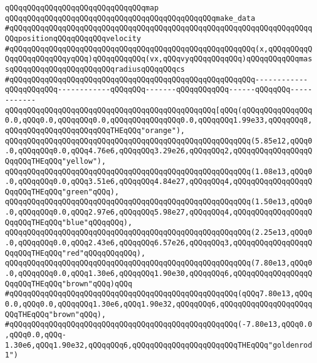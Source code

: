\verb|qQQqqQQqqQQqqQQqqQQqqQQqqQQqqQQqmap|\newline
\verb|qQQqqQQqqQQqqQQqqQQqqQQqqQQqqQQqqQQqqQQqqQQqqQQqmake_data|\newline
\verb|#qQQqqQQqqQQqqQQqqQQqqQQqqQQqqQQqqQQqqQQqqQQqqQQqqQQqqQQqqQQqqQQqqQQqqQQqpositionqQQqqQQqqQQqvelocity|\newline
\verb|#qQQqqQQqqQQqqQQqqQQqqQQqqQQqqQQqqQQqqQQqqQQqqQQqqQQqqQQq(x,qQQqqQQqqQQqqQQqqQQqqQQqyqQQq)qQQqqQQqqQQq(vx,qQQqvyqQQqqQQqqQQq)qQQqqQQqqQQqmassqQQqqQQqqQQqqQQqqQQqqQQqradiusqQQqqQQqcs|\newline
\verb|#qQQqqQQqqQQqqQQqqQQqqQQqqQQqqQQqqQQqqQQqqQQqqQQqqQQqqQQq------------qQQqqQQqqQQq------------qQQqqQQq-------qQQqqQQqqQQq------qQQqqQQq------------|\newline
\verb|qQQqqQQqqQQqqQQqqQQqqQQqqQQqqQQqqQQqqQQqqQQqqQQq[qQQq(qQQqqQQqqQQqqQQq0.0,qQQq0.0,qQQqqQQq0.0,qQQqqQQqqQQqqQQq0.0,qQQqqQQq1.99e33,qQQqqQQq8,qQQqqQQqqQQqqQQqqQQqqQQqTHEqQQq"orange"),|\newline
\verb|qQQqqQQqqQQqqQQqqQQqqQQqqQQqqQQqqQQqqQQqqQQqqQQqqQQqqQQq(5.85e12,qQQq0.0,qQQqqQQq0.0,qQQq4.76e6,qQQqqQQq3.29e26,qQQqqQQq2,qQQqqQQqqQQqqQQqqQQqqQQqTHEqQQq"yellow"),|\newline
\verb|qQQqqQQqqQQqqQQqqQQqqQQqqQQqqQQqqQQqqQQqqQQqqQQqqQQqqQQq(1.08e13,qQQq0.0,qQQqqQQq0.0,qQQq3.51e6,qQQqqQQq4.84e27,qQQqqQQq4,qQQqqQQqqQQqqQQqqQQqqQQqTHEqQQq"green"qQQq),|\newline
\verb|qQQqqQQqqQQqqQQqqQQqqQQqqQQqqQQqqQQqqQQqqQQqqQQqqQQqqQQq(1.50e13,qQQq0.0,qQQqqQQq0.0,qQQq2.97e6,qQQqqQQq5.98e27,qQQqqQQq4,qQQqqQQqqQQqqQQqqQQqqQQqTHEqQQq"blue"qQQqqQQq),|\newline
\verb|qQQqqQQqqQQqqQQqqQQqqQQqqQQqqQQqqQQqqQQqqQQqqQQqqQQqqQQq(2.25e13,qQQq0.0,qQQqqQQq0.0,qQQq2.43e6,qQQqqQQq6.57e26,qQQqqQQq3,qQQqqQQqqQQqqQQqqQQqqQQqTHEqQQq"red"qQQqqQQqqQQq),|\newline
\verb|qQQqqQQqqQQqqQQqqQQqqQQqqQQqqQQqqQQqqQQqqQQqqQQqqQQqqQQq(7.80e13,qQQq0.0,qQQqqQQq0.0,qQQq1.30e6,qQQqqQQq1.90e30,qQQqqQQq6,qQQqqQQqqQQqqQQqqQQqqQQqTHEqQQq"brown"qQQq)qQQq|\newline
\newline
\verb|#qQQqqQQqqQQqqQQqqQQqqQQqqQQqqQQqqQQqqQQqqQQqqQQqqQQq(qQQq7.80e13,qQQq0.0,qQQq0.0,qQQqqQQq1.30e6,qQQq1.90e32,qQQqqQQq6,qQQqqQQqqQQqqQQqqQQqqQQqTHEqQQq"brown"qQQq),|\newline
\verb|#qQQqqQQqqQQqqQQqqQQqqQQqqQQqqQQqqQQqqQQqqQQqqQQqqQQq(-7.80e13,qQQq0.0,qQQq0.0,qQQq-1.30e6,qQQq1.90e32,qQQqqQQq6,qQQqqQQqqQQqqQQqqQQqqQQqTHEqQQq"goldenrod1")|\newline

